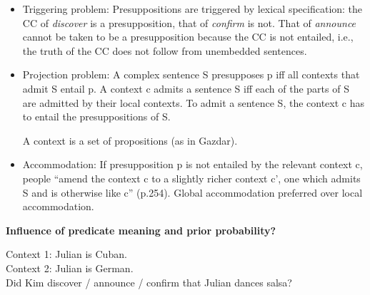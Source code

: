 \documentclass[11pt,fleqn]{article}
\newcommand{\6}{\mbox{$[\hspace*{-.6mm}[$}}
\newcommand{\9}{\mbox{$]\hspace*{-.6mm}]$}}
\begin{document}
\begin{itemize}

\item Triggering problem: Presuppositions are triggered by lexical specification: the CC of {\em discover} is a presupposition, that of {\em confirm} is not. That of {\em announce} cannot be taken to be a presupposition because the CC is not entailed, i.e., the truth of the CC does not follow from unembedded sentences.

\item Projection problem: A complex sentence S presupposes p iff all contexts that admit S entail p. A context c admits a sentence S iff each of the parts of S are admitted by their local contexts. To admit a sentence S, the context c has to entail the presuppositions of S.

A context is a set of propositions (as in Gazdar).

%
%
%
%

\item Accommodation: If presupposition p is not entailed by the relevant context c, people ``amend the context c to a slightly richer context c', one which admits S and is otherwise like c'' (p.254). Global accommodation preferred over local accommodation.

\end{itemize}

\noindent
{\bf Influence of predicate meaning and prior probability?}

\begin{exe}
\ex\label{ex2} 
Context 1: Julian is Cuban. \\
Context 2: Julian is German. \\ 
Did Kim discover / announce / confirm that Julian dances salsa?
\end{exe}
\end{document}
